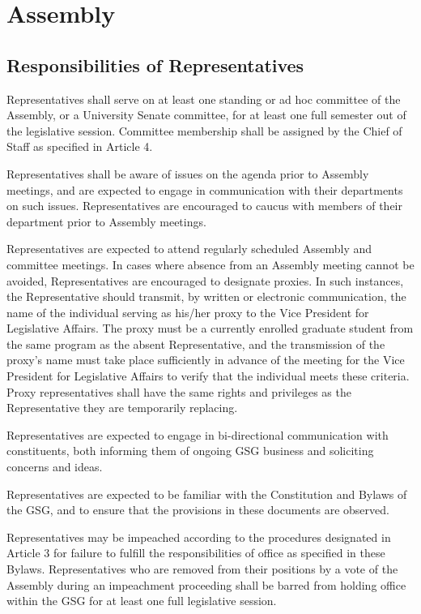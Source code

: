 \chapter{Assembly}
\section{Responsibilities of Representatives}
\begin{bylaws-number}
  \item Representatives shall serve on at least one standing or ad hoc committee of the Assembly, or a University Senate committee, for at least one full semester out of the legislative session. Committee membership shall be assigned by the Chief of Staff as specified in Article 4.
  \item Representatives shall be aware of issues on the agenda prior to Assembly meetings, and are expected to engage in communication with their departments on such issues. Representatives are encouraged to caucus with members of their department prior to Assembly meetings.
  \item Representatives are expected to attend regularly scheduled Assembly and committee meetings. In cases where absence from an Assembly meeting cannot be avoided, Representatives are encouraged to designate proxies. In such instances, the Representative should transmit, by written or electronic communication, the name of the individual serving as his/her proxy to the Vice President for Legislative Affairs. The proxy must be a currently enrolled graduate student from the same program as the absent Representative, and the transmission of the proxy’s name must take place sufficiently in advance of the meeting for the Vice President for Legislative Affairs to verify that the individual meets these criteria. Proxy representatives shall have the same rights and privileges as the Representative they are temporarily replacing.
  \item Representatives are expected to engage in bi-directional communication with constituents, both informing them of ongoing GSG business and soliciting concerns and ideas.
  \item Representatives are expected to be familiar with the Constitution and Bylaws of the GSG, and to ensure that the provisions in these documents are observed.
  \item Representatives may be impeached according to the procedures designated in Article 3 for failure to fulfill the responsibilities of office as specified in these Bylaws. Representatives who are removed from their positions by a vote of the Assembly during an impeachment proceeding shall be barred from holding office within the GSG for at least one full legislative session.

\end{bylaws-number}
